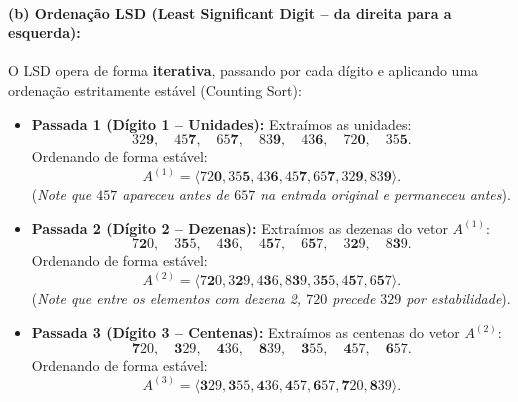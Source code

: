 \documentclass[11pt,a4paper]{article}
\begin{document}
\paragraph{(b) Ordenação LSD (Least Significant Digit -- da direita para a esquerda):}
O LSD opera de forma \textbf{iterativa}, passando por cada dígito e aplicando uma ordenação estritamente estável (Counting Sort):
\begin{itemize}
    \item \textbf{Passada 1 (Dígito 1 -- Unidades):}
    Extraímos as unidades:
    \[
        32\mathbf{9},\quad 45\mathbf{7},\quad 65\mathbf{7},\quad 83\mathbf{9},\quad 43\mathbf{6},\quad 72\mathbf{0},\quad 35\mathbf{5}.
    \]
    Ordenando de forma estável:
    \[
        A^{(1)} = \langle 72\mathbf{0}, 35\mathbf{5}, 43\mathbf{6}, 45\mathbf{7}, 65\mathbf{7}, 32\mathbf{9}, 83\mathbf{9} \rangle.
    \]
    (\textit{Note que $457$ apareceu antes de $657$ na entrada original e permaneceu antes}).

    \item \textbf{Passada 2 (Dígito 2 -- Dezenas):}
    Extraímos as dezenas do vetor $A^{(1)}$:
    \[
        7\mathbf{2}0,\quad 3\mathbf{5}5,\quad 4\mathbf{3}6,\quad 4\mathbf{5}7,\quad 6\mathbf{5}7,\quad 3\mathbf{2}9,\quad 8\mathbf{3}9.
    \]
    Ordenando de forma estável:
    \[
        A^{(2)} = \langle 7\mathbf{2}0, 3\mathbf{2}9, 4\mathbf{3}6, 8\mathbf{3}9, 3\mathbf{5}5, 4\mathbf{5}7, 6\mathbf{5}7 \rangle.
    \]
    (\textit{Note que entre os elementos com dezena 2, $720$ precede $329$ por estabilidade}).

    \item \textbf{Passada 3 (Dígito 3 -- Centenas):}
    Extraímos as centenas do vetor $A^{(2)}$:
    \[
        \mathbf{7}20,\quad \mathbf{3}29,\quad \mathbf{4}36,\quad \mathbf{8}39,\quad \mathbf{3}55,\quad \mathbf{4}57,\quad \mathbf{6}57.
    \]
    Ordenando de forma estável:
    \[
        A^{(3)} = \langle \mathbf{3}29, \mathbf{3}55, \mathbf{4}36, \mathbf{4}57, \mathbf{6}57, \mathbf{7}20, \mathbf{8}39 \rangle.
    \]
\end{itemize}
\end{document}
